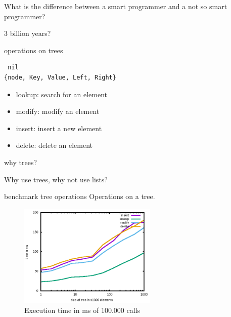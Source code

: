 \begin{frame}

What is the difference between a smart programmer and a not so smart programmer?

\vspace{60pt}
\pause \centerline{3 billion years?}

\end{frame}

\begin{frame}[fragile]{operations on trees}

\begin{verbatim}
 nil
{node, Key, Value, Left, Right}
\end{verbatim}
\pause\vspace{20pt}
    \begin{itemize}
        \item lookup: search for an element 
        \item modify: modify an element
        \item insert: insert a new element
        \item delete: delete an element
     \end{itemize}

\end{frame}





\begin{frame}{why trees?}

Why use trees, why not use lists?

\end{frame}

\begin{frame}{benchmark tree operations}
 Operations on a tree.
 \begin{figure}
  \centering
  \includegraphics[height=140pt]{tree.png}
  \caption{Execution time in ms of 100.000 calls}
 \end{figure}

\end{frame}

